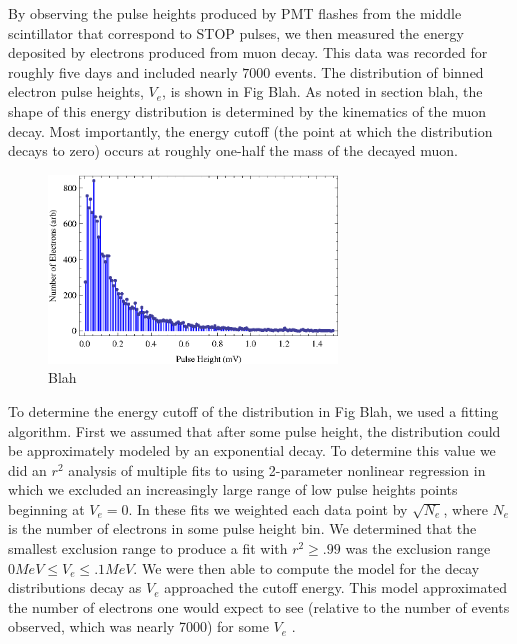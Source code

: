 By observing the pulse heights produced by PMT flashes from the middle
scintillator that correspond to STOP pulses, we then measured the
energy deposited by electrons produced from muon decay.  This data was
recorded for roughly five days and included nearly $7000$ events.  The
distribution of binned electron pulse heights, $V_{e}$, is shown in
Fig Blah.  As noted in section blah, the shape of this energy
distribution is determined by the kinematics of the muon decay.  Most
importantly, the energy cutoff (the point at which the distribution
decays to zero) occurs at roughly one-half the mass of the decayed
muon.


\begin{figure}[htbp]
\begin{center}
\includegraphics[height=50mm]{./figures/Electron_Energy_Cutoff.eps}
\caption{Blah}
\label{figure:logic}
\end{center}
\end{figure}

To determine the energy cutoff of the distribution in Fig Blah, we
used a fitting algorithm.  First we assumed that after some pulse
height, the distribution could be approximately modeled by an
exponential decay.  To determine this value we did an $r^{2}$ analysis
of multiple fits to using 2-parameter nonlinear regression in which we
excluded an increasingly large range of low pulse heights points
beginning at $V_{e}=0$.  In these fits we weighted each data point by
$\sqrt{N_{e}}$, where $N_{e}$ is the number of electrons in some pulse
height bin.  We determined that the smallest exclusion range to
produce a fit with $r^{2}\geq.99$ was the exclusion range $0 MeV \leq
V_{e}\leq .1 MeV$.  We were then able to compute the model for the
decay distributions decay as $V_{e}$ approached the cutoff energy.
This model approximated the number of electrons one would expect to
see (relative to the number of events observed, which was nearly 7000)
for some $V_{e}$ .

